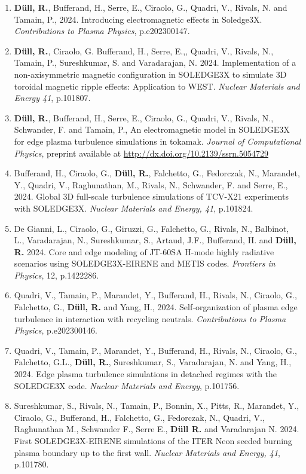 \newpage
{}
\label{chap:publications}
\begin{enumerate}
\item \textbf{Düll, R.}, Bufferand, H., Serre, E., Ciraolo, G., Quadri, V., Rivals, N. and Tamain, P., 2024. Introducing electromagnetic effects in Soledge3X. \textit{Contributions to Plasma Physics}, p.e202300147.
\item \textbf{Düll, R.}, Ciraolo, G. Bufferand, H., Serre, E.,, Quadri, V., Rivals, N., Tamain, P., Sureshkumar, S. and Varadarajan, N. 2024. Implementation of a non-axisymmetric magnetic configuration in SOLEDGE3X to simulate 3D toroidal magnetic ripple effects: Application to WEST. \textit{Nuclear Materials and Energy 41}, p.101807.
\item \textbf{Düll, R.}, Bufferand, H., Serre, E., Ciraolo, G., Quadri, V., Rivals, N., Schwander, F. and Tamain, P., An electromagnetic model in SOLEDGE3X for edge plasma turbulence simulations in tokamak. \textit{Journal of Computational Physics}, preprint available at \url{http://dx.doi.org/10.2139/ssrn.5054729}
\item Bufferand, H., Ciraolo, G., \textbf{Düll, R.}, Falchetto, G., Fedorczak, N., Marandet, Y., Quadri, V., Raghunathan, M., Rivals, N., Schwander, F. and Serre, E., 2024. Global 3D full-scale turbulence simulations of TCV-X21 experiments with SOLEDGE3X. \textit{Nuclear Materials and Energy, 41}, p.101824.
\item De Gianni, L., Ciraolo, G., Giruzzi, G., Falchetto, G., Rivals, N., Balbinot, L., Varadarajan, N., Sureshkumar, S., Artaud, J.F., Bufferand, H. and \textbf{Düll, R.} 2024. Core and edge modeling of JT-60SA H-mode highly radiative scenarios using SOLEDGE3X-EIRENE and METIS codes. \textit{Frontiers in Physics}, 12, p.1422286.
\item Quadri, V., Tamain, P., Marandet, Y., Bufferand, H., Rivals, N., Ciraolo, G., Falchetto, G., \textbf{Düll, R.} and Yang, H., 2024. Self‐organization of plasma edge turbulence in interaction with recycling neutrals. \textit{Contributions to Plasma Physics}, p.e202300146.
\item  Quadri, V., Tamain, P., Marandet, Y., Bufferand, H., Rivals, N., Ciraolo, G., Falchetto, G.L., \textbf{Düll, R.}, Sureshkumar, S., Varadarajan, N. and Yang, H., 2024. Edge plasma turbulence simulations in detached regimes with the SOLEDGE3X code. \textit{Nuclear Materials and Energy}, p.101756.
\item Sureshkumar, S., Rivals, N., Tamain, P., Bonnin, X., Pitts, R., Marandet, Y., Ciraolo, G., Bufferand, H., Falchetto, G., Fedorczak, N., Quadri, V., Raghunathan M., Schwander F., Serre E., \textbf{Düll R.}  and Varadarajan N. 2024. First SOLEDGE3X-EIRENE simulations of the ITER Neon seeded burning plasma boundary up to the first wall. \textit{Nuclear Materials and Energy, 41}, p.101780.
\end{enumerate}


